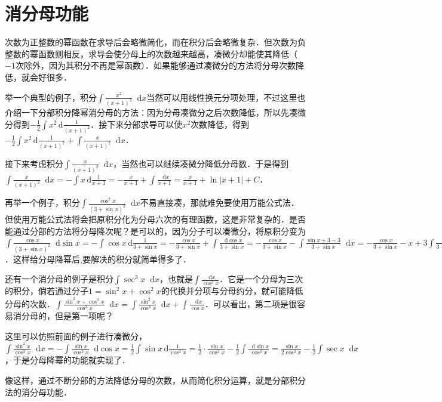 \documentclass{ctexbook}
\newcommand*{\dif}{\mathop{}\!\mathrm{d}}
\begin{document}
\section{消分母功能}
次数为正整数的幂函数在求导后会略微简化，而在积分后会略微复杂．但次数为负整数的幂函数则相反，求导会使分母上的次数越来越高，凑微分却能使其降低（$-1$次除外，因为其积分不再是幂函数）．如果能够通过凑微分的方法将分母次数降低，就会好很多．\par
举一个典型的例子，积分$\int\frac{x^{2}}{\left(x+1\right)^{3}}\dif{x}$当然可以用线性换元分项处理，不过这里也介绍一下分部积分降幂消分母的方法：因为分母凑微分之后次数降低，所以先凑微分得到$-\frac{1}{2}\int x^{2}\,\mathrm{d}\frac{1}{\left(x+1\right)^{2}}$．接下来分部求导可以使$x^{2}$次数降低，得到$-\frac{1}{2}\int x^{2}\,\mathrm{d}\frac{1}{\left(x+1\right)^{2}}+\int\frac{x}{\left(x+1\right)^{2}}\dif{x}$．\par
接下来考虑积分$\int\frac{x}{\left(x+1\right)^{2}}\dif{x}$，当然也可以继续凑微分降低分母数．于是得到$\int\frac{x}{\left(x+1\right)^{2}}\dif{x}=-\int x\,\mathrm{d}\frac{1}{x+1}=-\frac{x}{x+1}+\int\frac{\dif{x}}{x+1}=\frac{x}{x+1}+\ln{|x+1|}+C$．\par
再举一个例子，积分$\int\frac{\cos^{2}{x}}{\left(3+\sin{x}\right)^{2}}\dif{x}$不易直接凑，那就难免要使用万能公式法．但使用万能公式法将会把原积分化为分母六次的有理函数，这是非常复杂的．是否能通过分部的方法将分母降次呢？是可以的，因为分子可以凑微分，将原积分变为$\int\frac{\cos{x}}{\left(3+\sin{x}\right)^{2}}\dif{\sin{x}}=-\int\cos{x}\,\mathrm{d}\frac{1}{3+\sin{x}}=-\frac{\cos{x}}{3+\sin{x}}+\int\frac{\dif{\cos{x}}}{3+\sin{x}}=-\frac{\cos{x}}{3+\sin{x}}-\int\frac{\sin{x}+3-3}{3+\sin{x}}\dif{x}=-\frac{\cos{x}}{3+\sin{x}}-x+3\int\frac{\dif{x}}{3+\sin{x}}$．这样给分母降幂后,要解决的积分就简单得多了．\par
还有一个消分母的例子是积分$\int\sec^{3}{x}\dif{x}$，也就是$\int\frac{\dif{x}}{\cos^{3}{x}}$．它是一个分母为三次的积分，倘若通过分子$1=\sin^{2}{x}+\cos^{2}{x}$的代换并分项与分母约分，就可能降低分母的次数．$\int\frac{\sin^{2}{x}+\cos^{2}{x}}{\cos^{3}{x}}\dif{x}=\int\frac{\sin^{2}{x}}{\cos^{3}{x}}\dif{x}+\int\frac{\dif{x}}{\cos{x}}$．可以看出，第二项是很容易消分母的，但是第一项呢？\par
这里可以仿照前面的例子进行凑微分，$\int\frac{\sin^{2}{x}}{\cos^{3}{x}}\dif{x}=-\int\frac{\sin{x}}{\cos^{3}{x}}\dif{\cos{x}}=\frac{1}{2}\int\sin{x}\,\mathrm{d}\frac{1}{\cos^{2}{x}}=\frac{1}{2}\cdot\frac{\sin{x}}{\cos^{2}{x}}-\frac{1}{2}\int\frac{\dif{\sin{x}}}{\cos^{2}{x}}=\frac{\sin{x}}{2\cos^{2}{x}}-\frac{1}{2}\int\sec{x}\dif{x}$，于是分母降幂的功能就实现了．\par
像这样，通过不断分部的方法降低分母的次数，从而简化积分运算，就是分部积分法的消分母功能．\par
\end{document}
